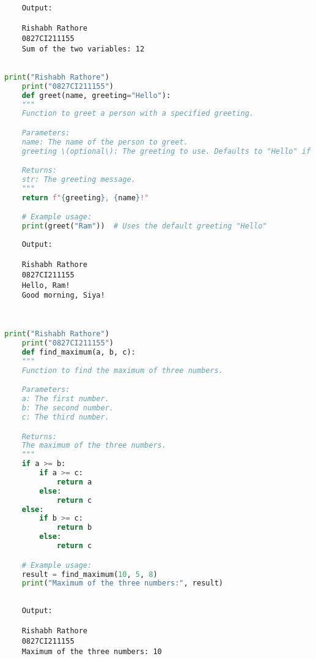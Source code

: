 \documentclass{report}
\begin{document}
\begin{verbatim}
	Output:

	Rishabh Rathore
	0827CI211155
	Sum of the two variables: 12


\end{verbatim}


\newpage


\sol 
\begin{lstlisting}[language=Python]
	print("Rishabh Rathore")
	print("0827CI211155")
	def greet(name, greeting="Hello"):
    """
    Function to greet a person with a specified greeting.

    Parameters:
    name: The name of the person to greet.
    greeting \(optional\): The greeting to use. Defaults to "Hello" if not specified.

    Returns:
    str: The greeting message.
    """
    return f"{greeting}, {name}!"

	# Example usage:
	print(greet("Ram"))  # Uses the default greeting "Hello"

\end{lstlisting}

\begin{verbatim}
	Output:

	Rishabh Rathore
	0827CI211155
	Hello, Ram!
	Good morning, Siya!
	
	
\end{verbatim}


\newpage


\sol 
\begin{lstlisting}[language=Python]
	print("Rishabh Rathore")
	print("0827CI211155")
	def find_maximum(a, b, c):
    """
    Function to find the maximum of three numbers.

    Parameters:
    a: The first number.
    b: The second number.
    c: The third number.

    Returns:
    The maximum of the three numbers.
    """
    if a >= b:
        if a >= c:
            return a
        else:
            return c
    else:
        if b >= c:
            return b
        else:
            return c

	# Example usage:
	result = find_maximum(10, 5, 8)
	print("Maximum of the three numbers:", result)
  

\end{lstlisting}

\begin{verbatim}
	Output:

	Rishabh Rathore
	0827CI211155
	Maximum of the three numbers: 10

\end{verbatim}
\end{document}
